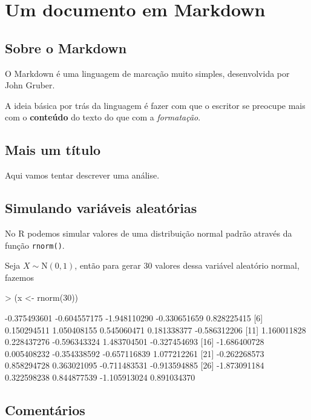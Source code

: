 \documentclass{article}
\begin{document}
\section{Um documento em Markdown}

\subsection{Sobre o Markdown}

O Markdown é uma linguagem de marcação muito simples, desenvolvida por
John Gruber.

A ideia básica por trás da linguagem é fazer com que o escritor se
preocupe mais com o \textbf{conteúdo} do texto do que com a
\emph{formatação}.

\subsection{Mais um título}

Aqui vamos tentar descrever uma análise.

\subsection{Simulando variáveis aleatórias}

No R podemos simular valores de uma distribuição normal padrão através
da função \texttt{rnorm()}.

Seja $X \sim \text{N}(0,1)$, então para gerar 30 valores dessa
variável aleatório normal, fazemos

\begin{Schunk}
\begin{Sinput}
> (x <- rnorm(30))
\end{Sinput}
\begin{Soutput}
 [1] -0.375493601 -0.604557175 -1.948110290 -0.330651659  0.828225415
 [6]  0.150294511  1.050408155  0.545060471  0.181338377 -0.586312206
[11]  1.160011828  0.228437276 -0.596343324  1.483704501 -0.327454693
[16] -1.686400728  0.005408232 -0.354338592 -0.657116839  1.077212261
[21] -0.262268573  0.858294728  0.363021095 -0.711483531 -0.913594885
[26] -1.873091184  0.322598238  0.844877539 -1.105913024  0.891034370
\end{Soutput}
\end{Schunk}

\subsection{Comentários}
\end{document}

